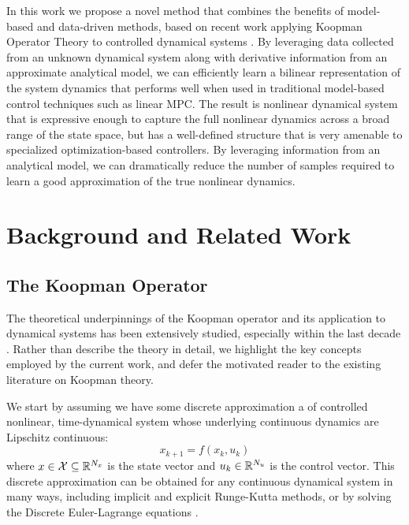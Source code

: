 \documentclass{article}
\begin{document}
    In this work we propose a novel method that combines the benefits of model-based and
    data-driven methods, based on recent work  applying Koopman Operator Theory to
    controlled dynamical systems 
    \cite{Meduri2022,Bruder2021,Korda2018,Folkestad2020,Suh2020}.
    By leveraging data collected from an
    unknown dynamical system along with derivative information from an approximate
    analytical model, we can efficiently learn a bilinear representation of the system
    dynamics that performs well when used in traditional model-based control techniques such
    as linear MPC. The result is nonlinear dynamical system that is expressive enough to
    capture the full nonlinear dynamics across a broad range of the state space, but has a
    well-defined structure that is very amenable to specialized optimization-based
    controllers. By leveraging information from an analytical model, we can dramatically
    reduce the number of samples required to learn a good approximation of the true
    nonlinear dynamics. 
    
    

\section{Background and Related Work} \label{sec:Preliminaries/Background}

  \subsection{The Koopman Operator}
  The theoretical underpinnings of the Koopman operator and its application to dynamical
  systems has been extensively studied, especially within the last decade 
  \cite{Fasel2021,Proctor2018,Bruder2021,Williams2015}. Rather than describe the theory in
  detail, we highlight the key concepts employed by the current work, and defer the
  motivated reader to the existing literature on Koopman theory.

  We start by assuming we have some discrete approximation a of controlled nonlinear,
  time-dynamical system whose underlying continuous dynamics are Lipschitz continuous:
  \begin{equation} \label{eq:discrete_dynamics} x_{k+1} = f(x_k, u_k) \end{equation} where
  $x \in \mathcal{X} \subseteq \mathbb{R}^{N_x}$ is the state vector and $u_k \in \mathbb{R}^{N_u}$ is the
  control vector.  This discrete approximation can be obtained for any continuous dynamical
  system in many ways, including implicit and explicit Runge-Kutta methods, or by solving
  the Discrete Euler-Lagrange equations \cite{Brudigam2021a,Brudigam2021,Howell2022}.
\end{document}
